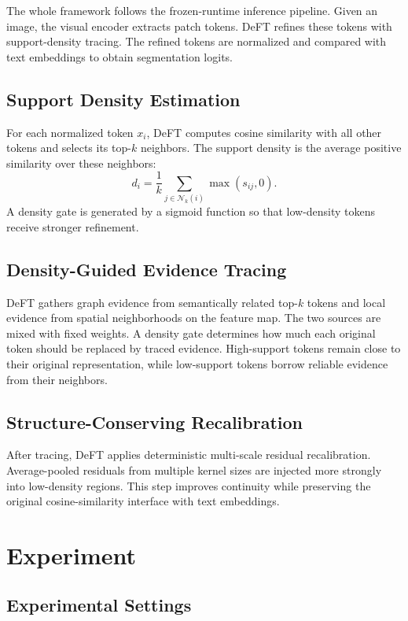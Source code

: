 \documentclass[letterpaper]{article}
\begin{document}
The whole framework follows the frozen-runtime inference pipeline. Given an
image, the visual encoder extracts patch tokens. DeFT refines these tokens
with support-density tracing. The refined tokens are normalized and compared
with text embeddings to obtain segmentation logits.

\subsection{Support Density Estimation}

For each normalized token $x_i$, DeFT computes cosine similarity with all
other tokens and selects its top-$k$ neighbors. The support density is the
average positive similarity over these neighbors:
\begin{equation}
    d_i = \frac{1}{k}\sum_{j \in \mathcal{N}_k(i)} \max(s_{ij}, 0).
\end{equation}
A density gate is generated by a sigmoid function so that low-density tokens
receive stronger refinement.

\subsection{Density-Guided Evidence Tracing}

DeFT gathers graph evidence from semantically related top-$k$ tokens and local
evidence from spatial neighborhoods on the feature map. The two sources are
mixed with fixed weights. A density gate determines how much each original
token should be replaced by traced evidence. High-support tokens remain close
to their original representation, while low-support tokens borrow reliable
evidence from their neighbors.

\subsection{Structure-Conserving Recalibration}

After tracing, DeFT applies deterministic multi-scale residual recalibration.
Average-pooled residuals from multiple kernel sizes are injected more strongly
into low-density regions. This step improves continuity while preserving the
original cosine-similarity interface with text embeddings.

\section{Experiment}

\subsection{Experimental Settings}
\end{document}
